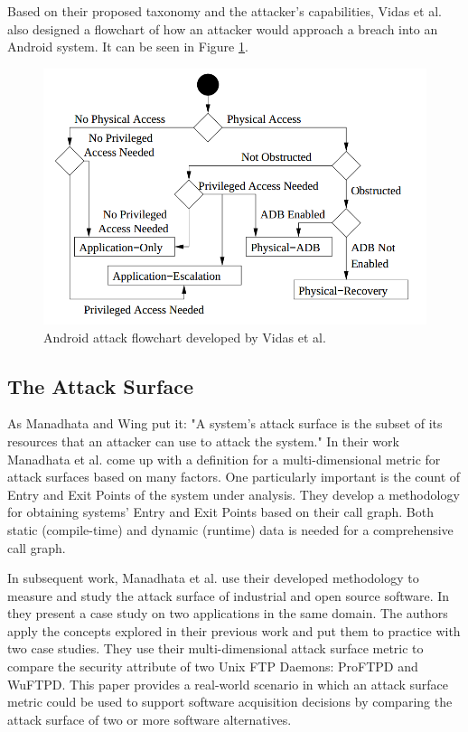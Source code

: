 \documentclass{sig-alternate}
\begin{document}
Based on their proposed taxonomy and the attacker's capabilities, Vidas et al. also designed a flowchart of how an attacker would approach a breach into an Android system. It can be seen in Figure \ref{fig:attackflow}.

\begin{figure}
  \centering
  \includegraphics[scale=0.30]{figs/attackflow.png}
  \caption{Android attack flowchart developed by Vidas et al.}
  \label{fig:attackflow}
\end{figure}

\subsection{The Attack Surface}

As Manadhata and Wing \cite{Manadhata2011AnAttackSurfaceMetric} put it: "A system's attack surface is the subset of its resources that an attacker can use to attack the system." In their work Manadhata et al. \cite{Manadhata2011AnAttackSurfaceMetric} come up with a definition for a multi-dimensional metric for attack surfaces based on many factors. One particularly important is the count of Entry and Exit Points of the system under analysis. They develop a methodology for obtaining systems' Entry and Exit Points based on their call graph. Both static (compile-time) and dynamic (runtime) data is needed for a comprehensive call graph.

In subsequent work, Manadhata et al. \cite{manadhata_measuring_2006} \cite{manadhata2009report} use their developed methodology to measure and study the attack surface of industrial and open source software. In  \cite{manadhata_measuring_2006} they present a case study on two applications in the same domain. The authors apply the concepts explored in their previous work and put them to practice with two case studies. They use their multi-dimensional attack surface metric to compare the security attribute of two Unix FTP Daemons: ProFTPD and WuFTPD. This paper provides a real-world scenario in which an attack surface metric could be used to support software acquisition decisions by comparing the attack surface of two or more software alternatives.
\end{document}
